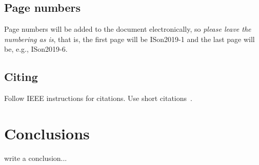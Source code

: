 \documentclass{article}
\begin{document}
\subsection{Page numbers}
Page numbers will be added to the document electronically, so
{\em please leave the numbering as is}, that is, the first page will be
ISon2019-1 and the last page will be, e.g., ISon2019-6.

\subsection{Citing}
Follow IEEE instructions for citations. Use short citations~\cite{icad1,ison1}.
%
\section{Conclusions}
write a conclusion...



\end{document}
